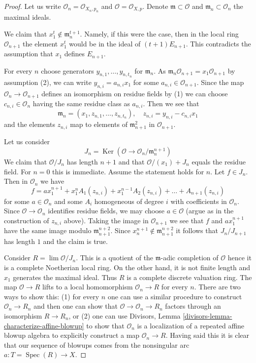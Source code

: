 \documentclass[10pt,a4paper]{amsart}
\theoremstyle{plain}
\theoremstyle{definition}
\theoremstyle{remark}
\numberwithin{equation}{subsection}
\def\lim{\mathop{\mathrm{lim}}\nolimits}
\def\Spec{\mathop{\mathrm{Spec}}}
\def\Ker{\mathop{\mathrm{Ker}}}
\begin{document}
\begin{proof}
Let us write $\mathcal{O}_n = \mathcal{O}_{X_n, p_n}$
and $\mathcal{O} = \mathcal{O}_{X, p}$. Denote
$\mathfrak m \subset \mathcal{O}$ and $\mathfrak m_n \subset \mathcal{O}_n$
the maximal ideals.

\medskip\noindent
We claim that $x_1^t \not \in \mathfrak m_n^{t + 1}$.
Namely, if this were the case, then in the local ring
$\mathcal{O}_{n + 1}$ the element $x_1^t$ would be in the ideal of
$(t + 1)E_{n + 1}$.
This contradicts the assumption that $x_1$ defines $E_{n + 1}$.

\medskip\noindent
For every $n$ choose generators $y_{n, 1}, \ldots, y_{n, t_n}$
for $\mathfrak m_n$. As
$\mathfrak m_n \mathcal{O}_{n + 1} = x_1\mathcal{O}_{n + 1}$
by assumption (2), we can write $y_{n, i} = a_{n, i} x_1$
for some $a_{n, i} \in \mathcal{O}_{n + 1}$. Since
the map $\mathcal{O}_n \to \mathcal{O}_{n + 1}$ defines
an isomorphism on residue fields by (1) we can choose
$c_{n, i} \in \mathcal{O}_n$ having the same residue class as
$a_{n, i}$. Then we see that
$$
\mathfrak m_n = (x_1, z_{n, 1}, \ldots, z_{n, t_n}),
\quad z_{n, i} = y_{n, i} - c_{n, i} x_1
$$
and the elements $z_{n, i}$ map to elements of $\mathfrak m_{n + 1}^2$
in $\mathcal{O}_{n + 1}$.

\medskip\noindent
Let us consider
$$
J_n = \Ker(\mathcal{O} \to \mathcal{O}_n/\mathfrak m_n^{n + 1})
$$
We claim that $\mathcal{O}/J_n$ has length $n + 1$ and that
$\mathcal{O}/(x_1) + J_n$ equals the residue field. For $n = 0$
this is immediate. Assume the statement holds for $n$.
Let $f \in J_n$. Then in $\mathcal{O}_n$ we have
$$
f = a x_1^{n + 1} + x_1^n A_1(z_{n, i}) +
x_1^{n - 1} A_2(z_{n, i}) + \ldots + A_{n + 1}(z_{n, i})
$$
for some $a \in \mathcal{O}_n$ and some $A_i$ homogeneous of degree $i$
with coefficients in $\mathcal{O}_n$. Since $\mathcal{O} \to \mathcal{O}_n$
identifies residue fields, we may choose $a \in \mathcal{O}$
(argue as in the construction of $z_{n, i}$ above).
Taking the image in
$\mathcal{O}_{n + 1}$ we see that $f$ and $a x_1^{n + 1}$
have the same image modulo $\mathfrak m_{n + 1}^{n + 2}$.
Since $x_n^{n + 1} \not \in \mathfrak m_{n + 1}^{n + 2}$
it follows that $J_n/J_{n + 1}$ has length $1$ and the claim is true.

\medskip\noindent
Consider $R = \lim \mathcal{O}/J_n$. This is a quotient of
the $\mathfrak m$-adic completion of $\mathcal{O}$ hence it is
a complete Noetherian local ring. On the other hand, it is
not finite length and $x_1$ generates the maximal ideal.
Thus $R$ is a complete discrete valuation ring.
The map $\mathcal{O} \to R$ lifts to a local homomorphism
$\mathcal{O}_n \to R$ for every $n$. There are two ways to show this:
(1) for every $n$ one can use a similar procedure
to construct $\mathcal{O}_n \to R_n$ and then one can
show that $\mathcal{O} \to \mathcal{O}_n \to R_n$ factors
through an isomorphism $R \to R_n$, or (2) one can use
Divisors, Lemma \ref{divisors-lemma-characterize-affine-blowup}
to show that $\mathcal{O}_n$ is a localization of a repeated
affine blowup algebra to explicitly construct a map $\mathcal{O}_n \to R$.
Having said this it is clear that our sequence of blowups
comes from the nonsingular arc $a : T = \Spec(R) \to X$.
\end{proof}
\end{document}
